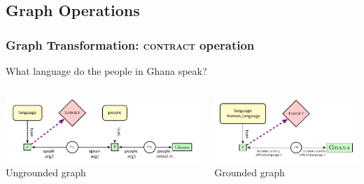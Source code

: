 \documentclass[mathserif,12pt]{beamer}
\newcommand \contract{\textsc{contract}\xspace}
\begin{document}
\subsection{Graph Operations}
\begin{frame}[noframenumbering]
\frametitle{Graph Transformation: \contract operation}

\begin{center}
  What language do the people in Ghana speak?
\end{center}

\begin{columns}
  \begin{column}{0.35\textwidth}
   \centering
   \includegraphics[width=\textwidth]{figures/en-language-ghana-ungrounded} \\
   \small Ungrounded graph
  \end{column}
  \begin{column}{0.35\textwidth}
    \centering
   \includegraphics[width=\textwidth]{figures/language-ghana-grounded} \\
   \small Grounded graph 
  \end{column}
\end{columns}
\end{frame}
\end{document}
